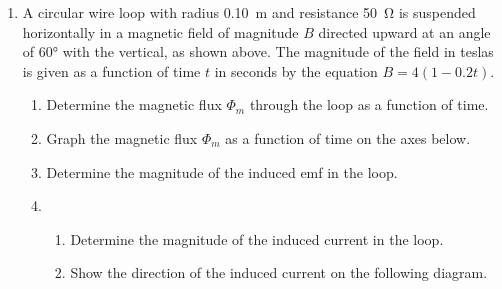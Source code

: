 \documentclass{../../../oss-classkick}
\begin{document}
\begin{enumerate}
  \begin{center}
  \end{center}
\item A circular wire loop with radius \SI{.10}{\metre} and resistance
  \SI{50}{\ohm} is suspended horizontally in a magnetic field of magnitude $B$
  directed upward at an angle of \ang{60} with the vertical, as shown above.
  The magnitude of the field in teslas is given as a function of time $t$ in
  seconds by the equation $B=4(1-0.2t)$.
  \begin{enumerate}
  \item Determine the magnetic flux $\Phi_m$ through the loop as a function of
    time.
  \item Graph the magnetic flux $\Phi_m$ as a function of time on the axes
    below.
    \begin{center}
    \end{center}
  \item Determine the magnitude of the induced emf in the loop.
  \item
    \begin{enumerate}
    \item Determine the magnitude of the induced current in the loop.
    \item Show the direction of the induced current on the following diagram.
    \end{enumerate}
    \begin{center}
    \end{center}
  \end{enumerate}
  \newpage
  

\end{enumerate}
\end{document}
